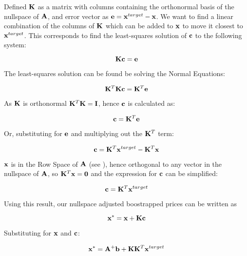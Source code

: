 \documentclass{article}
\begin{document}
\bigskip

Defined $\mathbf{K}$ as a matrix with columns containing the orthonormal basis of the nullspace
of $\mathbf{A}$, and error vector as $\mathbf{e} = \mathbf{x}^{target} - \mathbf{x}$. We want to find a linear combination
of the columns of $\mathbf{K}$ which can be added to $\mathbf{x}$ to move it closest to $\mathbf{x}^{target}$.
This corresponds to find the least-squares solution of $\mathbf{c}$ to the following system:

\begin{equation}
    \mathbf{K}\mathbf{c} = \mathbf{e}
\end{equation}

The least-squares solution can be found be solving the Normal Equations:

\begin{equation}
    \mathbf{K}^T \mathbf{K} \mathbf{c} = \mathbf{K}^T \mathbf{e}
\end{equation}

As $\mathbf{K}$ is orthonormal $\mathbf{K}^T \mathbf{K} = \mathbf{I}$, hence $\mathbf{c}$ is calculated as:

\begin{equation}
    \mathbf{c} = \mathbf{K}^T \mathbf{e}
\end{equation}

Or, substituting for $\mathbf{e}$ and multiplying out the $\mathbf{K}^T$ term:

\begin{equation}
    \mathbf{c} = \mathbf{K}^T \mathbf{x}^{target} - \mathbf{K}^T \mathbf{x}
\end{equation}

$\mathbf{x}$ is in the Row Space of $\mathbf{A}$ (see \cite{Strang}), hence orthogonal to 
any vector in the nullspace of $\mathbf{A}$, so $\mathbf{K}^T \mathbf{x} = \mathbf{0}$ and the expression 
for $\mathbf{c}$ can be simplified:

\begin{equation}
    \mathbf{c} = \mathbf{K}^T \mathbf{x}^{target}
\end{equation}



Using this result, our nullspace adjusted boostrapped prices can be written as

\begin{equation}
    \mathbf{x}^* = \mathbf{x} + \mathbf{K}\mathbf{c}
\end{equation}

Substituting for $\mathbf{x}$ and $\mathbf{c}$:

\begin{equation}
    \mathbf{x}^* = \mathbf{A}^+ \mathbf{b} + \mathbf{K} \mathbf{K}^T \mathbf{x}^{target}
\end{equation}
\end{document}
